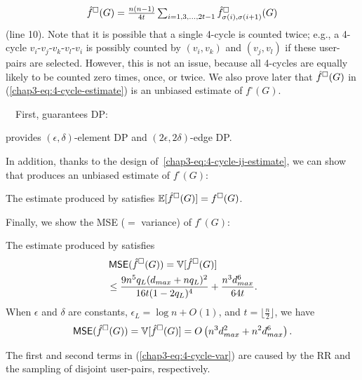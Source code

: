 \begin{equation}\label{chap3-eq:4-cycle-estimate}
  \textstyle{\hat{f}^\square(G) = \frac{n(n-1)}{4t}\sum_{i=1,3,\ldots,2t-1} \hat{f}_{\sigma(i),\sigma(i+1)}^\square(G)}
\end{equation}
(line 10). 
Note that it is possible that a single 4-cycle is counted twice; e.g., 
a 4-cycle $v_i$-$v_j$-$v_k$-$v_l$-$v_i$ is possibly counted by $(v_i,v_k)$ and $(v_j,v_l)$ if these user-pairs are selected. 
However, this is not an issue, because all 4-cycles are equally likely to be counted zero times, once, or twice. 
We also prove later that $\hat{f}^\square(G)$ in (\ref{chap3-eq:4-cycle-estimate}) is an unbiased estimate of $f^\square(G)$. 

\smallskip
{}~~First, \AlgWSCyc{} guarantees DP:
\begin{theorem}\label{chap3-thm:DP_IV}
\AlgWSCyc{} provides $(\epsilon, \delta)$-element DP and $(2\epsilon, 2\delta)$-edge DP.
\end{theorem}

In addition, thanks to the design of~\eqref{chap3-eq:4-cycle-ij-estimate}, we can show that \AlgWSCyc{} produces an unbiased estimate of $f^\square(G)$:
\begin{theorem}\label{chap3-thm:unbiased_IV}
  The estimate produced by \AlgWSCyc{} satisfies $\allowbreak \operatorname{\mathbb{E}}[\hat{f}^\square(G)] =
  f^\square(G)$.
\end{theorem}

Finally, we show the MSE ($=$ variance) of $f^\square(G)$:

\begin{theorem}\label{chap3-thm:l2-loss_IV}
  The estimate produced by \AlgWSCyc{} satisfies 
  \begin{align}
    & \operatorname{\textsf{MSE}}(\hat{f}^\square(G)) = \operatorname{\mathbb{V}}[\hat{f}^\square(G)] \nonumber \\
    &\leq \frac{9n^5 q_L(d_{max} +
    nq_L)^2}{16t(1-2q_L)^4} + \frac{n^3d_{max}^6}{64t}. \label{chap3-eq:4-cycle-var}
  \end{align}
  When $\epsilon$ and $\delta$ are constants, $\epsilon_L = \log n + O(1)$, and $t
  = \lfloor \frac{n}{2} \rfloor$, we have
  \begin{equation}\label{chap3-eq:4-cycle-var-simp}
    \operatorname{\textsf{MSE}}(\hat{f}^\square(G)) = \operatorname{\mathbb{V}}[\hat{f}^\square(G)] 
    = O\left( n^3 d_{max}^2 + n^2d_{max}^6 \right).
  \end{equation}
\end{theorem}
The first and second terms in (\ref{chap3-eq:4-cycle-var}) are caused by the RR and the sampling of disjoint user-pairs, respectively. 

